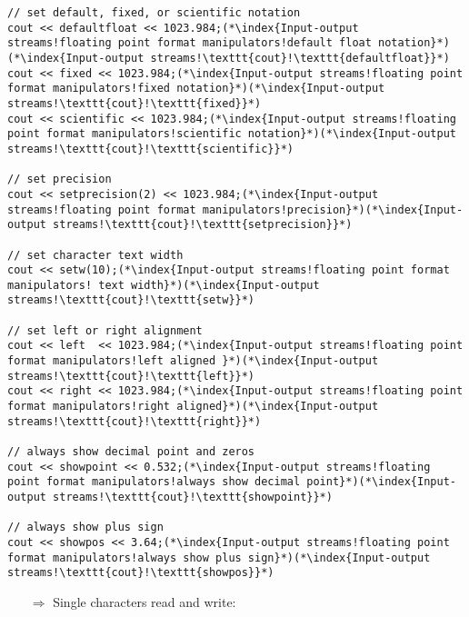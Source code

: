\documentclass[10pt]{article}
\begin{document}
\begin{lstlisting}
// set default, fixed, or scientific notation
cout << defaultfloat << 1023.984;(*\index{Input-output streams!floating point format manipulators!default float notation}*)(*\index{Input-output streams!\texttt{cout}!\texttt{defaultfloat}}*)
cout << fixed << 1023.984;(*\index{Input-output streams!floating point format manipulators!fixed notation}*)(*\index{Input-output streams!\texttt{cout}!\texttt{fixed}}*)
cout << scientific << 1023.984;(*\index{Input-output streams!floating point format manipulators!scientific notation}*)(*\index{Input-output streams!\texttt{cout}!\texttt{scientific}}*)

// set precision
cout << setprecision(2) << 1023.984;(*\index{Input-output streams!floating point format manipulators!precision}*)(*\index{Input-output streams!\texttt{cout}!\texttt{setprecision}}*)

// set character text width
cout << setw(10);(*\index{Input-output streams!floating point format manipulators! text width}*)(*\index{Input-output streams!\texttt{cout}!\texttt{setw}}*)

// set left or right alignment
cout << left  << 1023.984;(*\index{Input-output streams!floating point format manipulators!left aligned }*)(*\index{Input-output streams!\texttt{cout}!\texttt{left}}*)
cout << right << 1023.984;(*\index{Input-output streams!floating point format manipulators!right aligned}*)(*\index{Input-output streams!\texttt{cout}!\texttt{right}}*)

// always show decimal point and zeros
cout << showpoint << 0.532;(*\index{Input-output streams!floating point format manipulators!always show decimal point}*)(*\index{Input-output streams!\texttt{cout}!\texttt{showpoint}}*)

// always show plus sign
cout << showpos << 3.64;(*\index{Input-output streams!floating point format manipulators!always show plus sign}*)(*\index{Input-output streams!\texttt{cout}!\texttt{showpos}}*)
\end{lstlisting}
\begin{enumerate}
\item[$\Rightarrow$] Single characters read and write:
\end{enumerate}
\end{document}
